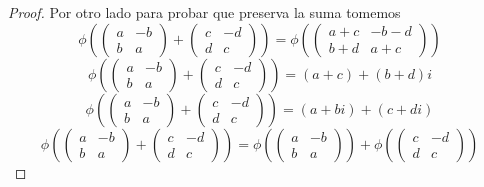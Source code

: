 \documentclass[letter,twoside,12pt]{article}
\begin{document}
\begin{proof}
Por otro lado para probar que preserva la suma tomemos
\[ \phi\left(\left( \begin{array}{cc}
a & -b \\
b & a \end{array} \right)+\left( \begin{array}{cc}
c & -d \\
d & c \end{array} \right)\right) = \phi\left(\left( \begin{array}{cc}
a+c & -b-d \\
b+d & a+c \end{array} \right)\right)\]
\[ \phi\left(\left( \begin{array}{cc}
a & -b \\
b & a \end{array} \right)+\left( \begin{array}{cc}
c & -d \\
d & c \end{array} \right)\right) = (a+c)+(b+d)i\]
\[ \phi\left(\left( \begin{array}{cc}
a & -b \\
b & a \end{array} \right)+\left( \begin{array}{cc}
c & -d \\
d & c \end{array} \right)\right) = (a+bi)+(c+di)\]
\[ \phi\left(\left( \begin{array}{cc}
a & -b \\
b & a \end{array} \right)+\left( \begin{array}{cc}
c & -d \\
d & c \end{array} \right)\right) = \phi\left(\left( \begin{array}{cc}
a & -b \\
b & a \end{array} \right)\right)+\phi\left(\left( \begin{array}{cc}
c & -d \\
d & c \end{array} \right)\right)\]


\end{proof}
\end{document}
